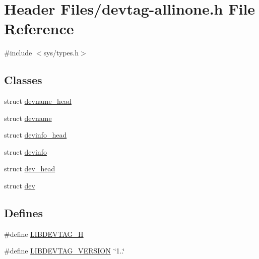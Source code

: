 \hypertarget{devtag-allinone_8h}{\section{\-Header \-Files/devtag-\/allinone.h \-File \-Reference}
\label{devtag-allinone_8h}
}
{\ttfamily \#include $<$sys/types.\-h$>$}\*
\subsection*{\-Classes}
\begin{DoxyCompactItemize}
\item 
struct \hyperlink{structdevname__head}{devname\-\_\-head}
\item 
struct \hyperlink{structdevname}{devname}
\item 
struct \hyperlink{structdevinfo__head}{devinfo\-\_\-head}
\item 
struct \hyperlink{structdevinfo}{devinfo}
\item 
struct \hyperlink{structdev__head}{dev\-\_\-head}
\item 
struct \hyperlink{structdev}{dev}
\end{DoxyCompactItemize}
\subsection*{\-Defines}
\begin{DoxyCompactItemize}
\item 
\#define \hyperlink{devtag-allinone_8h_a5b42bb98133067c1d12d97fa37563e81}{\-L\-I\-B\-D\-E\-V\-T\-A\-G\-\_\-\-H}
\item 
\#define \hyperlink{devtag-allinone_8h_aeaadf9a7ca373f48b8a9abf6f9b550ff}{\-L\-I\-B\-D\-E\-V\-T\-A\-G\-\_\-\-V\-E\-R\-S\-I\-O\-N}~\char`\"{}1..\char`\"{}
\end{DoxyCompactItemize}
